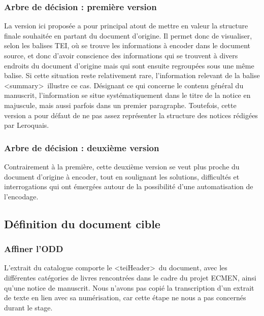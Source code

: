 \documentclass[a4paper,12pt,twoside]{book}
\begin{document}
	\subsubsection{\label{arbre_decision_1}Arbre de décision : première version}
	
	La version ici proposée a pour principal atout de mettre en valeur la structure finale souhaitée en partant du document d'origine. Il permet donc de visualiser, selon les balises TEI, où se trouve les informations à encoder dans le document source, et donc d'avoir conscience des informations qui se trouvent à divers endroits du document d'origine mais qui sont ensuite regroupées sous une même balise. Si cette situation reste relativement rare, l'information relevant de la balise \textless summary\textgreater~illustre ce cas. Désignant ce qui concerne le contenu général du manuscrit, l'information se situe systématiquement dans le titre de la notice en majuscule, mais aussi parfois dans un premier paragraphe. 
	Toutefois, cette version a pour défaut de ne pas assez représenter la structure des notices rédigées par Leroquais. 
	
	
	
	\subsubsection{\label{arbre_decision_2}Arbre de décision : deuxième version}
	
	Contrairement à la première, cette deuxième version se veut plus proche du document d'origine à encoder, tout en soulignant les solutions, difficultés et interrogations qui ont émergées autour de la possibilité d'une automatisation de l'encodage.
	
	
	
	\subsection{Définition du document cible}
	
	\subsubsection{\label{ODD}Affiner l'ODD}
	
	L'extrait du catalogue comporte le \textless teiHeader\textgreater~du document, avec les différentes catégories de livres rencontrées dans le cadre du projet ECMEN, ainsi qu'une notice de manuscrit. Nous n'avons pas copié la transcription d'un extrait de texte en lien avec sa numérisation, car cette étape ne nous a pas concernés durant le stage.
	
\end{document}
